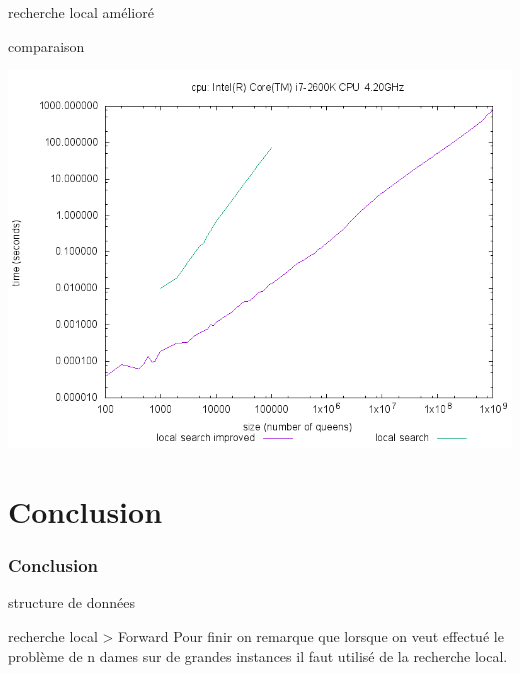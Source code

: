 \documentclass[10pt,a4paper]{beamer}
\begin{document}
\begin{frame}
\begin{block}{recherche local amélioré}
	\end{block}

	\begin{block}{comparaison}

	\includegraphics[width=1\textwidth]{images/plot_lst_ls_i7.png}

	\end{block}



\end{frame}

\section{Conclusion}
\begin{frame}
	\frametitle{Conclusion}

	\begin{block}{structure de données}


	\end{block}

	\begin{block}{recherche local > Forward}
		Pour finir on remarque que lorsque on veut effectué le problème de n dames sur de grandes instances il faut utilisé de la recherche local.
	\end{block}


\end{frame}
\end{document}
